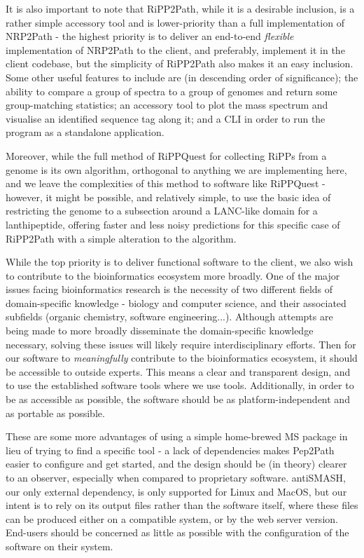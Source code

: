 \documentclass{l4proj}
\newcommand{\cit}[1]{\citep{#1}}
\begin{document}
It is also important to note that RiPP2Path, while it is a desirable inclusion, is a rather simple accessory tool and is lower-priority than a full implementation of NRP2Path - the highest priority is to deliver an end-to-end \textit{flexible} implementation of NRP2Path to the client, and preferably, implement it in the client codebase, but the simplicity of RiPP2Path also makes it an easy inclusion. Some other useful features to include are (in descending order of significance); the ability to compare a group of spectra to a group of genomes and return some group-matching statistics; an accessory tool to plot the mass spectrum and visualise an identified sequence tag along it; and a CLI in order to run the program as a standalone application.

Moreover, while the full method of RiPPQuest for collecting RiPPs from a genome is its own algorithm, orthogonal to anything we are implementing here, and we leave the complexities of this method to software like RiPPQuest - however, it might be possible, and relatively simple, to use the basic idea of restricting the genome to a subsection around a LANC-like domain for a lanthipeptide, offering faster and less noisy predictions for this specific case of RiPP2Path with a simple alteration to the algorithm.

While the top priority is to deliver functional software to the client, we also wish to contribute to the bioinformatics ecosystem more broadly. One of the major issues facing bioinformatics research is the necessity of two different fields of domain-specific knowledge - biology and computer science, and their associated subfields (organic chemistry, software engineering...). Although attempts are being made to more broadly disseminate the domain-specific knowledge necessary, \cit{msomics} solving these issues will likely require interdisciplinary efforts. Then for our software to \textit{meaningfully} contribute to the bioinformatics ecosystem, it should be accessible to outside experts. This means a clear and transparent design, and to use the established software tools where we use tools. Additionally, in order to be as accessible as possible, the software should be as platform-independent and as portable as possible. 

These are some more advantages of using a simple home-brewed MS package in lieu of trying to find a specific tool - a lack of dependencies makes Pep2Path easier to configure and get started, and the design should be (in theory) clearer to an observer, especially when compared to proprietary software. antiSMASH, our only external dependency, is only supported for Linux and MacOS, but our intent is to rely on its output files rather than the software itself, where these files can be produced either on a compatible system, or by the web server version. End-users should be concerned as little as possible with the configuration of the software on their system.
\end{document}
